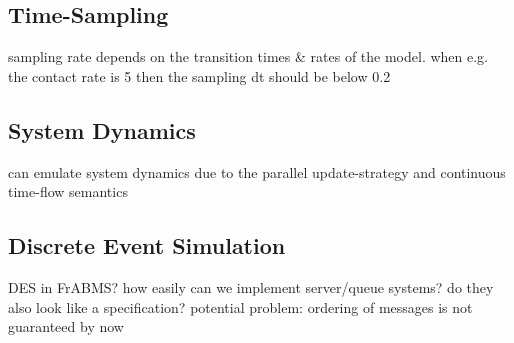 \subsection{Time-Sampling}
sampling rate depends on the transition times \& rates of the model. when e.g. the contact rate is 5 then the sampling dt should be below 0.2

\subsection{System Dynamics}
can emulate system dynamics due to the parallel update-strategy and continuous time-flow semantics

\subsection{Discrete Event Simulation}
DES in FrABMS? how easily can we implement server/queue systems? do they also look like a specification? potential problem: ordering of messages is not guaranteed by now


